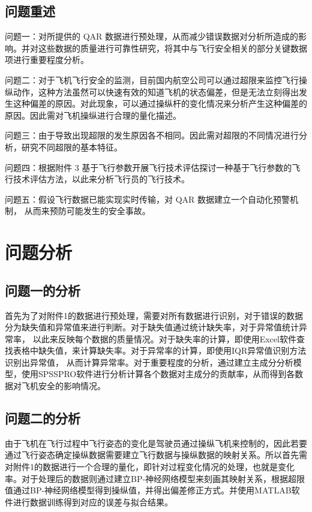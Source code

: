 \documentclass[UTF8]{ctexart}
\begin{document}
	\subsection{问题重述}
	问题一：对所提供的 QAR 数据进行预处理，从而减少错误数据对分析所造成的影响。并对这些数据的质量进行可靠性研究，将其中与飞行安全相关的部分关键数据项进行重要程度分析。 \par
	问题二：对于飞机飞行安全的监测，目前国内航空公司可以通过超限来监控飞行操纵动作，这种方法虽然可以快速有效的知道飞机的状态偏差，但是无法立刻得出发生这种偏差的原因。对此现象，可以通过操纵杆的变化情况来分析产生这种偏差的原因。因此需对飞机操纵进行合理的量化描述。 \par
	问题三：由于导致出现超限的发生原因各不相同。因此需对超限的不同情况进行分析，研究不同超限的基本特征。 \par
	问题四：根据附件 3 基于飞行参数开展飞行技术评估探讨一种基于飞行参数的飞行技术评估方法，以此来分析飞行员的飞行技术。 \par
	问题五：假设飞行数据已能实现实时传输，对 QAR 数据建立一个自动化预警机制， 从而来预防可能发生的安全事故。 \par
	
	\section{问题分析}
	\subsection{问题一的分析}
	首先为了对附件1的数据进行预处理，需要对所有数据进行识别，对于错误的数据分为缺失值和异常值来进行判断。对于缺失值通过统计缺失率，对于异常值统计异常率， 以此来反映每个数据的质量情况。对于缺失率的计算，即使用Excel软件查找表格中缺失值，来计算缺失率。对于异常率的计算，即使用IQR异常值识别方法识别出异常值， 从而计算异常率。对于重要程度的分析，通过建立主成分分析模型，使用SPSSPRO软件进行分析计算各个数据对主成分的贡献率，从而得到各数据对飞机安全的影响情况。 \par
	\subsection{问题二的分析}
	由于飞机在飞行过程中飞行姿态的变化是驾驶员通过操纵飞机来控制的，因此若要通过飞行姿态确定操纵数据需要建立飞行数据与操纵数据的映射关系。所以首先需对附件1的数据进行一个合理的量化，即针对过程变化情况的处理，也就是变化率。对于处理后的数据则通过建立BP-神经网络模型来刻画其映射关系，根据超限值通过BP-神经网络模型得到操纵值，并得出偏差修正方式。并使用MATLAB软件进行数据训练得到对应的误差与拟合结果。\par
\end{document}
